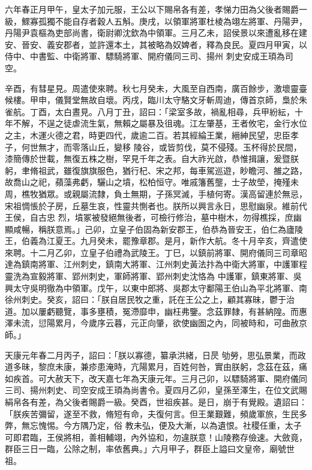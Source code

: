 \begin{pinyinscope}
 六年春正月甲午，皇太子加元服，王公以下賜帛各有差，孝悌力田為父後者賜爵一級，鰥寡孤獨不能自存者穀人五斛。庚戌，以領軍將軍杜棱為翊左將軍、丹陽尹，丹陽尹袁樞為吏部尚書，衛尉卿沈欽為中領軍。三月乙未，詔侯景以來遭亂移在建安、晉安、義安郡者，並許還本土，其被略為奴婢者，釋為良民。夏四月甲寅，以侍中、中書監、中衛將軍、驃騎將軍、開府儀同三司、揚州
 刺史安成王頊為司空。



 辛酉，有彗星見。周遣使來聘。秋七月癸未，大風至自西南，廣百餘步，激壞靈臺候樓。甲申，儀賢堂無故自壞。丙戌，臨川太守駱文牙斬周迪，傳首京師，梟於朱雀航。丁酉，太白晝見。八月丁丑，詔曰：「梁室多故，禍亂相尋，兵甲紛紜，十年不解，不逞之徒虐流生氣，無賴之屬暴及徂魂。江左肇基，王者攸宅，金行水位之主，木運火德之君，時更四代，歲逾二百。若其經綸王業，縉紳民望，忠臣孝子，何世無才，而零落山丘，變移
 陵谷，或皆剪伐，莫不侵殘。玉杯得於民間，漆簡傳於世載，無復五株之樹，罕見千年之表。自大祚光啟，恭惟揖讓，爰暨朕躬，聿脩祖武，雖復旗旗服色，猶行杞、宋之邦，每車駕巡遊，眇瞻河、雒之路，故喬山之祀，蘋藻弗虧，驪山之墳，松柏恒守。唯戚籓舊壟，士子故塋，掩殣未周，樵牧猶眾。或親屬流隸，負土無期，子孫冥滅，手植何寄。漢高留連於無忌，宋祖惆悵於子房，丘墓生哀，性靈共惻者也。朕所以興言永日，思慰幽泉。維前代王侯，自古忠
 烈，墳冢被發絕無後者，可檢行修治，墓中樹木，勿得樵採，庶幽顯咸暢，稱朕意焉。」己卯，立皇子伯固為新安郡王，伯恭為晉安王，伯仁為廬陵王，伯義為江夏王。九月癸未，罷豫章郡。是月，新作大航。冬十月辛亥，齊遣使來聘。十二月乙卯，立皇子伯禮為武陵王。丁巳，以鎮前將軍、開府儀同三司章昭達為鎮南將軍、江州刺史，鎮南大將軍、江州刺史黃法抃為中衛大將軍，中護軍程靈洗為宣毅將軍、郢州刺史，軍師將軍、郢州刺史沈恪為
 中護軍，鎮東將軍、吳興太守吳明徹為中領軍。戊午，以東中郎將、吳郡太守鄱陽王伯山為平北將軍、南徐州刺史。癸亥，詔曰：「朕自居民牧之重，託在王公之上，顧其寡昧，鬱于治道。加以屢虧聽覽，事多壅積，冤滯靡申，幽枉弗鑒。念茲罪隸，有甚納隍。而惠澤未流，愆陽累月，今歲序云暮，元正向肇，欲使幽圄之內，同被時和，可曲赦京師。」



 天康元年春二月丙子，詔曰：「朕以寡德，纂承洪緒，日昃
 劬勞，思弘景業，而政道多昧，黎庶未康，兼疹患淹時，亢陽累月，百姓何咎，實由朕躬，念茲在茲，痛如疾首。可大赦天下，改天嘉七年為天康元年。三月己卯，以驃騎將軍、開府儀同三司、揚州刺史、司空安成王頊為尚書令。夏四月乙卯，皇孫至澤生，在位文武賜絹帛各有差，為父後者賜爵一級。癸酉，世祖疾甚。是日，崩于有覺殿。遺詔曰：「朕疾苦彌留，遂至不救，脩短有命，夫復何言。但王業艱難，頻歲軍旅，生民多弊，無忘愧惕。今方隅乃定，俗
 教未弘，便及大漸，以為遺恨。社稷任重，太子可即君臨，王侯將相，善相輔翊，內外協和，勿違朕意！山陵務存儉速。大斂竟，群臣三日一臨，公除之制，率依舊典。」六月甲子，群臣上謚曰文皇帝，廟號世祖。




\end{pinyinscope}
